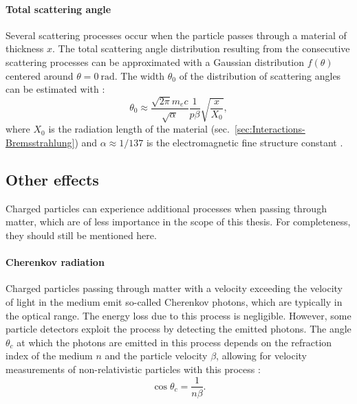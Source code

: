 \paragraph{Total scattering angle}
Several scattering processes occur when the particle passes through a material of thickness $x$. The total scattering angle distribution resulting from the consecutive scattering processes can be approximated with a Gaussian distribution $f(\theta)$ centered around $\theta=\SI{0}{\radian}$. The width $\theta_0$ of the distribution of scattering angles can be estimated with \cite{Book-KolanoskiWermes}:
\begin{equation*}
    \theta_0 \approx \frac{\sqrt{2\pi} m_e c}{\sqrt{\alpha}} \frac{1}{p \beta} \sqrt{\frac{x}{X_0}},
\end{equation*}
where $X_0$ is the radiation length of the material (sec.\ \ref{sec:Interactions-Bremsstrahlung}) and $\alpha \approx 1/137$ is the electromagnetic fine structure constant \cite{PDG2024}.

\subsection{Other effects}
\label{sec:Interactions-OtherEffects}
Charged particles can experience additional processes when passing through matter, which are of less importance in the scope of this thesis. For completeness, they should still be mentioned here.
\paragraph{Cherenkov radiation}
Charged particles passing through matter with a velocity exceeding the velocity of light in the medium emit so-called Cherenkov photons, which are typically in the optical range. The energy loss due to this process is negligible. However, some particle detectors exploit the process by detecting the emitted photons. The angle $\theta_c$ at which the photons are emitted in this process depends on the refraction index of the medium $n$ and the particle velocity $\beta$, allowing for velocity measurements of non-relativistic particles with this process \cite{Book-KolanoskiWermes,PDG2024}:
\begin{equation*}
    \cos\theta_c=\frac{1}{n\beta}.
\end{equation*}
